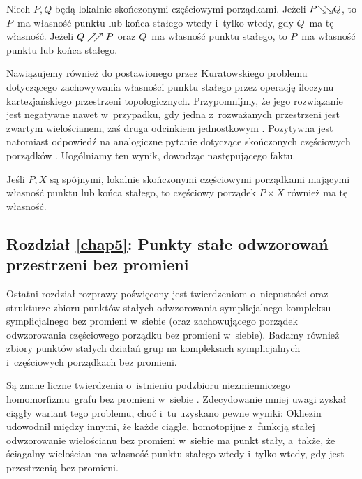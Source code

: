 \begin{tw*}[\ref{tw-loc_fin_fpp_thm_dism_2}, \ref{wn-loc_fin_fpp_thm_dism_1}]
Niech $P,Q$ będą lokalnie skończonymi częściowymi porządkami. Jeżeli $P{\searrow\!\!\searrow} Q$, to $P$~ma własność punktu lub końca stałego wtedy i~tylko wtedy, gdy $Q$~ma tę własność. Jeżeli $Q\nearrow\!\!\nearrow P$ oraz $Q$~ma własność punktu stałego, to $P$~ma własność punktu lub końca stałego.
\end{tw*}

Nawiązujemy również do postawionego przez Kuratowskiego \cite{Kuratowski30} problemu dotyczącego zachowywania własności punktu stałego przez operację iloczynu kartezjańskiego przestrzeni topologicznych. Przypomnijmy, że jego rozwiązanie jest negatywne nawet w~przypadku, gdy jedna z~rozważanych przestrzeni jest zwartym wielościanem, zaś druga odcinkiem jednostkowym \cite{Brown82}. Pozytywna jest natomiast odpowiedź na analogiczne pytanie dotyczące skończonych częściowych porządków \cite{Roddy94}. Uogólniamy ten wynik, dowodząc następującego faktu.

\begin{stw*}[\ref{stw-produkt_fpep_ma_fpep}]
Jeśli $P,X$ są spójnymi, lokalnie skończonymi częściowymi porządkami mającymi własność punktu lub końca stałego, to częściowy porządek $P\times X$ również ma tę własność.
\end{stw*}

\subsection*{Rozdział \ref{chap5}: Punkty stałe odwzorowań przestrzeni bez promieni}
Ostatni rozdział rozprawy poświęcony jest twierdzeniom o~niepustości oraz strukturze zbioru punktów stałych odwzorowania symplicjalnego kompleksu symplicjalnego bez promieni w~siebie (oraz zachowującego porządek odwzorowania częściowego porządku bez promieni w~siebie). Badamy również zbiory punktów stałych działań grup na kompleksach symplicjalnych i~częściowych porządkach bez promieni.

Są znane liczne twierdzenia o~istnieniu podzbioru niezmienniczego homomorfizmu~grafu bez promieni w~siebie \cite{Nowakowski79,Espinola06,Halin98,Polat93,Polat95,Polat96,Polat98,Polat04,Polat09,Polat12,Polat94,Schmidt83}. Zdecydowanie mniej uwagi zyskał ciągły wariant tego problemu, choć i~tu uzyskano pewne wyniki: Okhezin \cite{Okhezin95} udowodnił między innymi, że każde ciągłe, homotopijne z~funkcją stałej odwzorowanie wielościanu bez promieni w~siebie ma punkt stały, a~także, że ściągalny wielościan ma własność punktu stałego wtedy i~tylko wtedy, gdy jest przestrzenią bez promieni.

